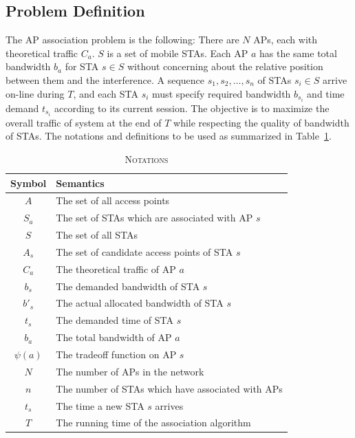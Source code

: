 \documentclass[conference]{IEEEtran}
\begin{document}
  \subsection{Problem Definition}
  The AP association problem is the following:  There are $N$ APs, each with theoretical traffic $C_a$.  $S$ is a set of mobile STAs.  Each AP $a$ has the same total bandwidth $b_a$ for STA $s\in S$ without concerning about the relative position between them and the interference.  A sequence $s_1,s_2,\ldots,s_n$ of STAs $s_i\in S$ arrive on-line during $T$, and each STA $s_i$ must specify required bandwidth $b_{s_i}$ and time demand $t_{s_i}$ according to its current session. The objective is to maximize the overall traffic of system at the end of $T$ while respecting the quality of bandwidth of STAs. The notations and definitions to be used as summarized in Table~\ref{tb:notation}.
\begin{table}[!ht]
  \centering
  \caption{{\scshape Notations}}\label{tb:notation}
    \begin{tabular}{|c|p{6cm}|}
    \hline
    {\bf Symbol}& \hfil{\bf Semantics}\hfil \\
    \hline
    $A$ & The set of all access points \\
    \hline
    $S_a$ & The set of STAs which are associated with AP $s$\\
    \hline
    $S$ & The set of all STAs \\
    \hline
    $A_s$ & The set of candidate access points of STA $s$ \\
    \hline
    $C_a$ & The theoretical traffic of AP $a$ \\
    \hline
    $b_s$ & The demanded bandwidth of STA $s$\\
    \hline
    $b'_s$ & The actual allocated bandwidth of STA $s$\\
    \hline
    $t_s$ & The demanded time of STA $s$\\
    \hline
    $b_a$ & The total bandwidth of AP $a$\\
    \hline
    $\psi(a)$ & The trade\-off function on AP $s$\\
    \hline
    $N$ & The number of APs in the network\\
    \hline
    $n$ & The number of STAs which have associated with APs\\
    \hline
    $t_s$ & The time a new STA $s$ arrives\\
    \hline
    $T$ & The running time of the association algorithm\\
    \hline
    \end{tabular}
  \end{table}
\end{document}
